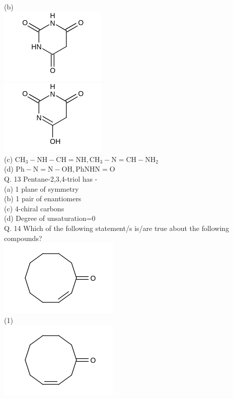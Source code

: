 \documentclass[10pt]{article}
\begin{document}
(b)\\
\includegraphics{smile-64a0d759a7c5fef05813d23e8d8fece7ee9d7d05}\\
\includegraphics{smile-9cf0b0595089dfc49ec8255012990f623909a27b}\\
(c) $\mathrm{CH}_{3}-\mathrm{NH}-\mathrm{CH}=\mathrm{NH}, \mathrm{CH}_{3}-\mathrm{N}=\mathrm{CH}-\mathrm{NH}_{2}$\\
(d) $\mathrm{Ph}-\mathrm{N}=\mathrm{N}-\mathrm{OH}, \mathrm{Ph} \mathrm{NHN}=\mathrm{O}$\\
Q. 13 Pentane-2,3,4-triol has -\\
(a) 1 plane of symmetry\\
(b) 1 pair of enantiomers\\
(c) 4-chiral carbons\\
(d) Degree of unsaturation=0\\
Q. 14 Which of the following statement/s is/are true about the following compounds?\\
\includegraphics{smile-dc15c738c7bc9fcb714bae3027fdb6e047e06e2e}\\
(1)\\
\includegraphics{smile-c496cbdc898b601ce0ec1de0a0e1ca8927f9756f}\\
\end{document}
